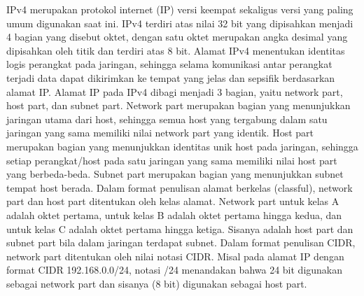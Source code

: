 IPv4 merupakan protokol internet (IP) versi keempat sekaligus versi yang paling umum digunakan saat ini. IPv4 terdiri atas nilai 32 bit yang dipisahkan menjadi 4 bagian yang disebut oktet, dengan satu oktet merupakan angka desimal yang dipisahkan oleh titik dan terdiri atas 8 bit. Alamat IPv4 menentukan identitas logis perangkat pada jaringan, sehingga selama komunikasi antar perangkat terjadi data dapat dikirimkan ke tempat yang jelas dan sepsifik berdasarkan alamat IP. Alamat IP pada IPv4 dibagi menjadi 3 bagian, yaitu network part, host part, dan subnet part. Network part merupakan bagian yang menunjukkan jaringan utama dari host, sehingga semua host yang tergabung dalam satu jaringan yang sama memiliki nilai network part yang identik. Host part merupakan bagian yang menunjukkan identitas unik host pada jaringan, sehingga setiap perangkat/host pada satu jaringan yang sama memiliki nilai host part yang berbeda-beda. Subnet part merupakan bagian yang menunjukkan subnet tempat host berada. Dalam format penulisan alamat berkelas (classful), network part dan host part ditentukan oleh kelas alamat. Network part untuk kelas A adalah oktet pertama, untuk kelas B adalah oktet pertama hingga kedua, dan untuk kelas C adalah oktet pertama hingga ketiga. Sisanya adalah host part dan subnet part bila dalam jaringan terdapat subnet. Dalam format penulisan CIDR, network part ditentukan oleh nilai notasi CIDR. Misal pada alamat IP dengan format CIDR 192.168.0.0/24, notasi /24 menandakan bahwa 24 bit digunakan sebagai network part dan sisanya (8 bit) digunakan sebagai host part.

